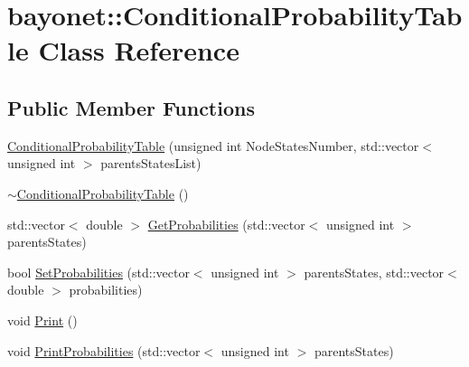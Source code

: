 \hypertarget{classbayonet_1_1_conditional_probability_table}{\section{bayonet\-:\-:Conditional\-Probability\-Table Class Reference}
\label{classbayonet_1_1_conditional_probability_table}
}
\subsection*{Public Member Functions}
\begin{DoxyCompactItemize}
\item 
\hyperlink{classbayonet_1_1_conditional_probability_table_af83db269bcfc340658801d5e473ad5c8}{Conditional\-Probability\-Table} (unsigned int Node\-States\-Number, std\-::vector$<$ unsigned int $>$ parents\-States\-List)
\item 
\hyperlink{classbayonet_1_1_conditional_probability_table_a5fd07eba1d571bf8f8bac3014f2409b2}{$\sim$\-Conditional\-Probability\-Table} ()
\item 
std\-::vector$<$ double $>$ \hyperlink{classbayonet_1_1_conditional_probability_table_a7612e2c40e51eaf4d94109adb2bd269d}{Get\-Probabilities} (std\-::vector$<$ unsigned int $>$ parents\-States)
\item 
bool \hyperlink{classbayonet_1_1_conditional_probability_table_ac94cd225747e8f59c5497b860ff777c0}{Set\-Probabilities} (std\-::vector$<$ unsigned int $>$ parents\-States, std\-::vector$<$ double $>$ probabilities)
\item 
void \hyperlink{classbayonet_1_1_conditional_probability_table_a0815f7814cc5797629035f17f0cf26c2}{Print} ()
\item 
void \hyperlink{classbayonet_1_1_conditional_probability_table_a0ca5c1cbfeb5c86ef06161a810233b2a}{Print\-Probabilities} (std\-::vector$<$ unsigned int $>$ parents\-States)
\end{DoxyCompactItemize}


